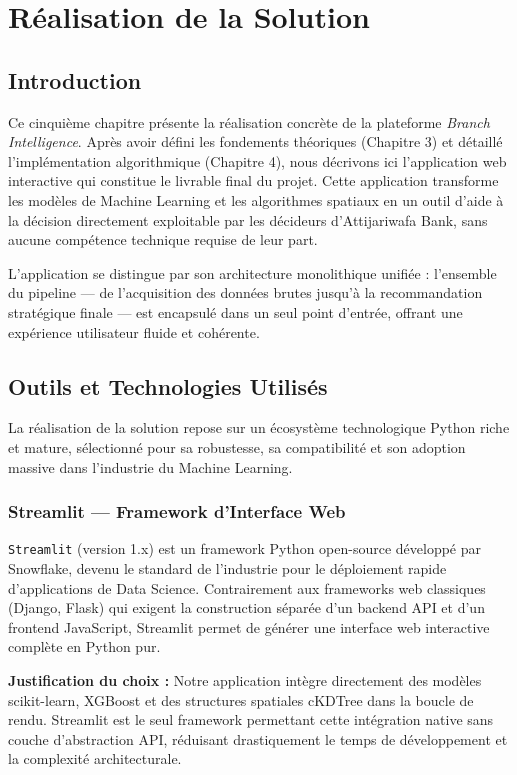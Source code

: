 
\chapter{Réalisation de la Solution}

\section{Introduction}

Ce cinquième chapitre présente la réalisation concrète de la plateforme \textit{Branch Intelligence}. Après avoir défini les fondements théoriques (Chapitre 3) et détaillé l'implémentation algorithmique (Chapitre 4), nous décrivons ici l'application web interactive qui constitue le livrable final du projet. Cette application transforme les modèles de Machine Learning et les algorithmes spatiaux en un outil d'aide à la décision directement exploitable par les décideurs d'Attijariwafa Bank, sans aucune compétence technique requise de leur part.

L'application se distingue par son architecture monolithique unifiée : l'ensemble du pipeline --- de l'acquisition des données brutes jusqu'à la recommandation stratégique finale --- est encapsulé dans un seul point d'entrée, offrant une expérience utilisateur fluide et cohérente.

\section{Outils et Technologies Utilisés}

La réalisation de la solution repose sur un écosystème technologique Python riche et mature, sélectionné pour sa robustesse, sa compatibilité et son adoption massive dans l'industrie du Machine Learning.

\subsection{Streamlit — Framework d'Interface Web}

\texttt{Streamlit} (version 1.x) est un framework Python open-source développé par Snowflake, devenu le standard de l'industrie pour le déploiement rapide d'applications de Data Science. Contrairement aux frameworks web classiques (Django, Flask) qui exigent la construction séparée d'un backend API et d'un frontend JavaScript, Streamlit permet de générer une interface web interactive complète en Python pur.

\textbf{Justification du choix :} Notre application intègre directement des modèles scikit-learn, XGBoost et des structures spatiales cKDTree dans la boucle de rendu. Streamlit est le seul framework permettant cette intégration native sans couche d'abstraction API, réduisant drastiquement le temps de développement et la complexité architecturale.

